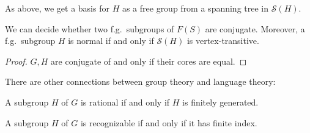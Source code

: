 As above, we get a basis for $H$ as a free group from a spanning tree in
$\mathcal{S}(H)$.

\begin{theorem}
  We can decide whether two f.g.\ subgroups of $F(S)$ are conjugate.
  Moreover, a f.g.\ subgroup $H$ is normal if and only if $\mathcal{S}(H)$
  is vertex-transitive.
\end{theorem}
\begin{proof}
  $G,H$ are conjugate of and only if their cores are equal.
\end{proof}

There are other connections between group theory and language theory:
\begin{theorem}
  A subgroup $H$ of $G$ is rational if and only if $H$ is finitely generated.
\end{theorem}
\begin{theorem}
  A subgroup $H$ of $G$ is recognizable if and only if it has finite index.
\end{theorem}

